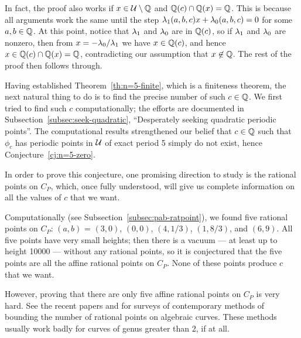 \begin{remark}
  In fact, the proof also works if $x \in \mathcal{U} \setminus \mathbb{Q}$ and $\mathbb{Q}(c)
  \cap \mathbb{Q}(x) = \mathbb{Q}$. This is because all arguments work the same until
  the step $\lambda_1(a, b, c) x + \lambda_0(a, b, c) = 0$ for some $a, b \in
  \mathbb{Q}$. At this point, notice that $\lambda_1$ and $\lambda_0$ are in $\mathbb{Q}(c)$, so
  if $\lambda_1$ and $\lambda_0$ are nonzero, then from $x = -\lambda_0/\lambda_1$ we have
  $x \in \mathbb{Q}(c)$, and hence $x \in \mathbb{Q}(c) \cap \mathbb{Q}(x) = \mathbb{Q}$,
  contradicting our assumption that $x \not\in \mathbb{Q}$. The rest of the
  proof then follows through.
\end{remark}

Having established Theorem~\ref{th:n=5-finite}, which is a finiteness
theorem, the next natural thing to do is to find the precise number of
such $c \in \mathbb{Q}$. We first tried to find such $c$ computationally; the
efforts are documented in Subsection~\ref{subsec:seek-quadratic},
``Desperately seeking quadratic periodic points''. The computational
results strengthened our belief that $c \in \mathbb{Q}$ such that $\phi_c$ has
periodic points in $\mathcal{U}$ of exact period 5 simply do not exist, hence
Conjecture~\ref{cj:n=5-zero}.

In order to prove this conjecture, one promising direction to study is
the rational points on $C_P$, which, once fully understood, will give
us complete information on all the values of $c$ that we want.

Computationally (see Subsection~\ref{subsec:pab-ratpoint}), we found
five rational points on $C_P$: $(a, b)$ = $(3, 0)$, $(0, 0)$, $(4,
1/3)$, $(1, 8/3)$, and $(6, 9)$. All five points have very small
heights; then there is a vacuum --- at least up to height 10000 ---
without any rational points, so it is conjectured that the five points
are all the affine rational points on $C_P$. None of these points
produce $c$ that we want.

However, proving that there are only five affine rational points on
$C_P$ is very hard. See the recent papers \cite{MR1956273} and
\cite{MR2780629} for surveys of contemporary methods of bounding the
number of rational points on algebraic curves. These methods usually
work badly for curves of genus greater than 2, if at all.

